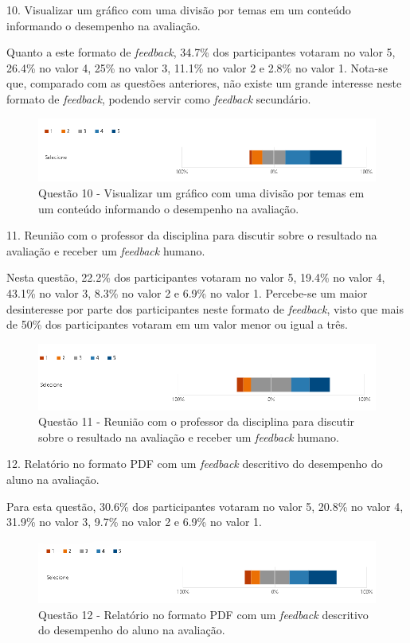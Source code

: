 10. Visualizar um gráfico com uma divisão por temas em um conteúdo informando o desempenho na avaliação.

Quanto a este formato de \textit{feedback}, 34.7\% dos participantes votaram no valor 5, 26.4\% no valor 4, 25\% no valor 3, 11.1\% no valor 2 e 2.8\% no valor 1. Nota-se que, comparado com as questões anteriores, não existe um grande interesse neste formato de \textit{feedback}, podendo servir como \textit{feedback} secundário.

\begin{figure}[H]
\centering
\caption{Questão 10 - Visualizar um gráfico com uma divisão por temas em um conteúdo informando o desempenho na avaliação.}
\includegraphics[scale=0.6]{figuras/10.png}
\end{figure}

11. Reunião com o professor da disciplina para discutir sobre o resultado na avaliação e receber um \textit{feedback} humano.

Nesta questão, 22.2\% dos participantes votaram no valor 5, 19.4\% no valor 4, 43.1\% no valor 3, 8.3\% no valor 2 e 6.9\% no valor 1. Percebe-se um maior desinteresse por parte dos participantes neste formato de \textit{feedback}, visto que mais de 50\% dos participantes votaram em um valor menor ou igual a três.

\begin{figure}[H]
\centering
\includegraphics[scale=0.6]{figuras/11.png}
\caption{Questão 11 - Reunião com o professor da disciplina para discutir sobre o resultado na avaliação e receber um \textit{feedback} humano.}
\end{figure}

12. Relatório no formato PDF com um \textit{feedback} descritivo do desempenho do aluno na avaliação. 

Para esta questão, 30.6\% dos participantes votaram no valor 5, 20.8\% no valor 4, 31.9\% no valor 3, 9.7\% no valor 2 e 6.9\% no valor 1. 

\begin{figure}[H]
\centering
\caption{Questão 12 - Relatório no formato PDF com um \textit{feedback} descritivo do desempenho do aluno na avaliação.}
\includegraphics[scale=0.6]{figuras/12.png}
\end{figure}
